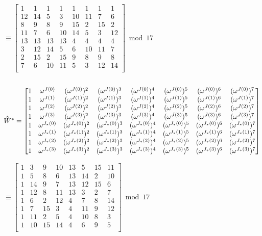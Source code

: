 $ \equiv \begin{bmatrix}
1 & 1 & 1 & 1 & 1 & 1 & 1 & 1\\
12&14&5&3&10&11&7&6\\
8&9&8&9&15&2&15&2\\
11&7&6&10&14&5&3&12\\
13&13&13&13&4&4&4&4\\
3&12&14&5&6&10&11&7\\
2&15&2&15&9&8&9&8\\
7&6&10&11&5&3&12&14\\
\end{bmatrix} \bmod{17}$ 

$ $ 

$\hathat W^* = \begin{bmatrix}
1 & \omega^{J(0)} & (\omega^{J(0)})^2 & (\omega^{J(0)})^3 & (\omega^{J(0)})^4 & (\omega^{J(0)})^5 & (\omega^{J(0)})^6 & (\omega^{J(0)})^7\\
1 & \omega^{J(1)} & (\omega^{J(1)})^2 & (\omega^{J(1)})^3 & (\omega^{J(1)})^4& (\omega^{J(1)})^5& (\omega^{J(1)})^6& (\omega^{J(1)})^7\\
1 & \omega^{J(2)} & (\omega^{J(2)})^2 & (\omega^{J(2)})^3 & (\omega^{J(2)})^4 & (\omega^{J(2)})^5 & (\omega^{J(2)})^6 & (\omega^{J(2)})^7\\
1 & \omega^{J(3)} & (\omega^{J(3)})^2 & (\omega^{J(3)})^3 & (\omega^{J(3)})^4& (\omega^{J(3)})^5& (\omega^{J(3)})^6& (\omega^{J(3)})^7\\
1 & \omega^{J_*(0)} & (\omega^{J_*(0)})^2 & (\omega^{J_*(0)})^3 & (\omega^{J_*(0)})^4 & (\omega^{J_*(0)})^5 & (\omega^{J_*(0)})^6 & (\omega^{J_*(0)})^7\\
1 & \omega^{J_*(1)} & (\omega^{J_*(1)})^2 & (\omega^{J_*(1)})^3 & (\omega^{J_*(1)})^4& (\omega^{J_*(1)})^5& (\omega^{J_*(1)})^6& (\omega^{J_*(1)})^7\\
1 & \omega^{J_*(2)} & (\omega^{J_*(2)})^2 & (\omega^{J_*(2)})^3 & (\omega^{J_*(2)})^4 & (\omega^{J_*(2)})^5 & (\omega^{J_*(2)})^6 & (\omega^{J_*(2)})^7\\
1 & \omega^{J_*(3)} & (\omega^{J_*(3)})^2 & (\omega^{J_*(3)})^3 & (\omega^{J_*(3)})^4& (\omega^{J_*(3)})^5& (\omega^{J_*(3)})^6& (\omega^{J_*(3)})^7\\
\end{bmatrix}$

$ \equiv \begin{bmatrix}
1&3&9&10&13&5&15&11\\
1&5&8&6&13&14&2&10\\
1&14&9&7&13&12&15&6\\
1&12&8&11&13&3&2&7\\
1&6&2&12&4&7&8&14\\
1&7&15&3&4&11&9&12\\
1&11&2&5&4&10&8&3\\
1&10&15&14&4&6&9&5\\
\end{bmatrix}  \bmod{17}$

